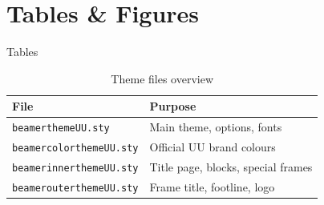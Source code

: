 \documentclass[aspectratio=169,10pt]{beamer}
\begin{document}
\section{Tables \& Figures}

\begin{frame}{Tables}
  \begin{table}
    \centering
    \caption{Theme files overview}
    \begin{tabular}{ll}
      \hline
      \textbf{File} & \textbf{Purpose} \\
      \hline
      \texttt{beamerthemeUU.sty}      & Main theme, options, fonts \\
      \texttt{beamercolorthemeUU.sty}  & Official UU brand colours \\
      \texttt{beamerinnerthemeUU.sty}  & Title page, blocks, special frames \\
      \texttt{beamerouterthemeUU.sty}  & Frame title, footline, logo \\
      \hline
    \end{tabular}
  \end{table}
\end{frame}
\end{document}
